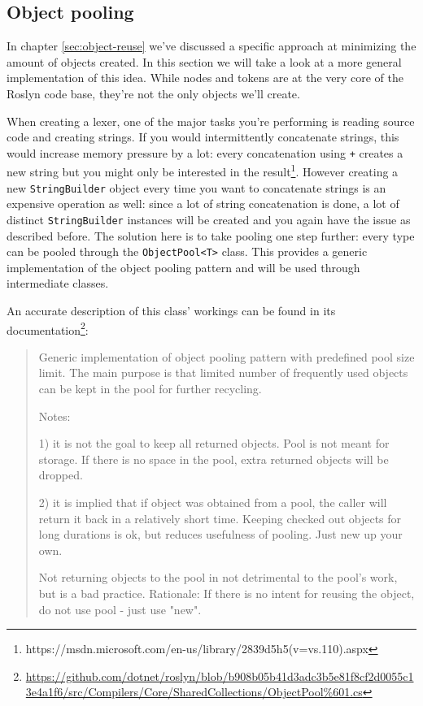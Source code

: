 \subsection{Object pooling}
\label{sec:object-pooling}

In chapter \ref{sec:object-reuse} we've discussed a specific approach at minimizing the amount of objects created. In this section we will take a look at a more general implementation of this idea. While nodes and tokens are at the very core of the Roslyn code base, they're not the only objects we'll create. 

When creating a lexer, one of the major tasks you're performing is reading source code and creating strings. If you would intermittently concatenate strings, this would increase memory pressure by a lot: every concatenation using \verb|+| creates a new string but you might only be interested in the result\footnote{https://msdn.microsoft.com/en-us/library/2839d5h5(v=vs.110).aspx}. 
However creating a new \verb|StringBuilder| object every time you want to concatenate strings is an expensive operation as well: since a lot of string concatenation is done, a lot of distinct \verb|StringBuilder| instances will be created and you again have the issue as described before. The solution here is to take pooling one step further: every type can be pooled through the \verb|ObjectPool<T>| class.\parencite{Warren2014} This provides a generic implementation of the object pooling pattern and will be used through intermediate classes.

An accurate description of this class' workings can be found in its documentation\footnote{\url{https://github.com/dotnet/roslyn/blob/b908b05b41d3adc3b5e81f8cf2d0055c13e4a1f6/src/Compilers/Core/SharedCollections/ObjectPool\%601.cs}}:

\begin{quotation}
Generic implementation of object pooling pattern with predefined pool size limit. The main
purpose is that limited number of frequently used objects can be kept in the pool for
further recycling.

Notes: 

1) it is not the goal to keep all returned objects. Pool is not meant for storage. If there
   is no space in the pool, extra returned objects will be dropped.

2) it is implied that if object was obtained from a pool, the caller will return it back in
   a relatively short time. Keeping checked out objects for long durations is ok, but 
   reduces usefulness of pooling. Just new up your own.

Not returning objects to the pool in not detrimental to the pool's work, but is a bad practice. 
Rationale: 
   If there is no intent for reusing the object, do not use pool - just use "new". 
\end{quotation}

